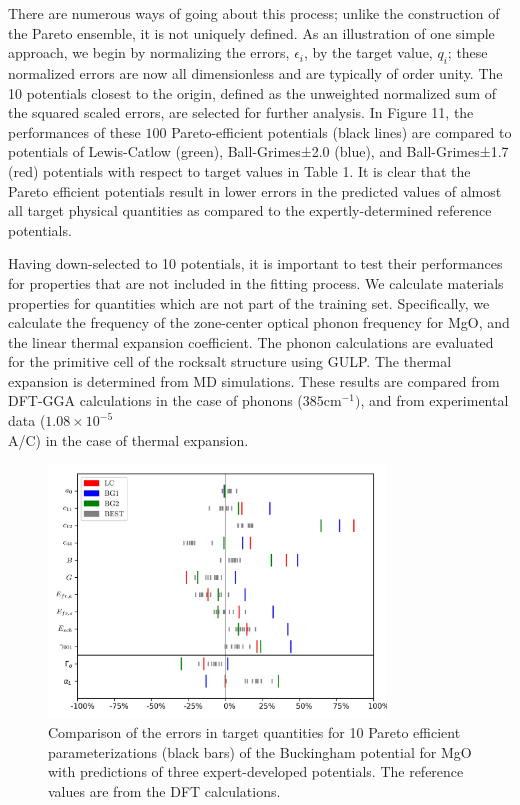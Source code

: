 	There are numerous ways of going about this process; unlike the construction of the Pareto ensemble, it is not uniquely defined.  As an illustration of one simple approach, we begin by normalizing the errors, $\epsilon_i$, by the target value, $q_i$; these normalized errors are now all dimensionless and are typically of order unity.  The 10 potentials closest to the origin, defined as the unweighted normalized sum of the squared scaled errors, are selected for further analysis.  In Figure 11, the performances of these $100$ Pareto-efficient potentials (black lines) are compared to potentials of Lewis-Catlow (green), Ball-Grimes±2.0 (blue), and Ball-Grimes±1.7 (red) potentials with respect to target values in Table 1. It is clear that the Pareto efficient potentials result in lower errors in the predicted values of almost all target physical quantities as compared to the expertly-determined reference potentials.

Having down-selected to 10 potentials, it is important to test their performances for properties that are not included in the fitting process. We calculate materials properties for quantities which are not part of the training set.  Specifically, we calculate the frequency of the zone-center optical phonon frequency for MgO, and the linear thermal expansion coefficient.  The phonon calculations are evaluated for the primitive cell of the rocksalt structure using GULP\cite{gale2003_gulp}.  The thermal expansion is determined from MD simulations. These results are compared from DFT-GGA calculations in the case of phonons ($385 \text{cm}^{-1})$, and from experimental data ($1.08\times10^{-5}$ \\A/\degree C) \cite{ho1998_thermal_expansion} in the case of thermal expansion.

\begin{figure}[ht]
	\centering
  \includegraphics[width=0.8\textwidth]{chapter7/MgO_qoi_rugplots}
  \caption{Comparison of the errors in target quantities for 10 Pareto efficient parameterizations (black bars) of the Buckingham potential for MgO with predictions of three expert-developed potentials. The reference values are from the DFT calculations.}
  \label{fig:MgO_qoi_rugplots}
\end{figure}


